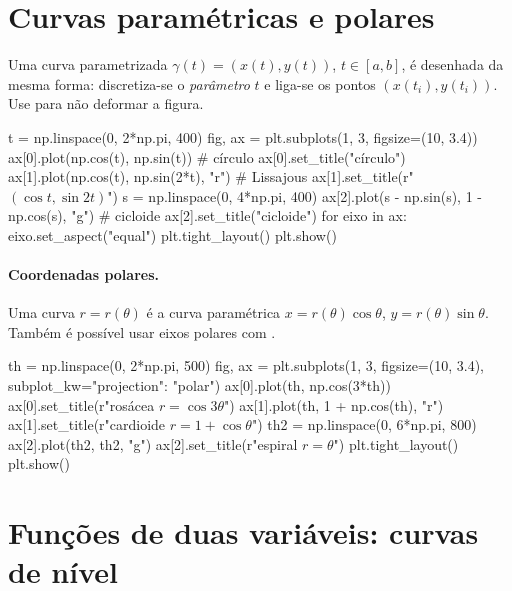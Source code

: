 \section{Curvas paramétricas e polares}

Uma curva parametrizada $\gamma(t)=(x(t),y(t))$, $t\in[a,b]$, é desenhada da mesma forma: discretiza-se o
\emph{parâmetro} $t$ e liga-se os pontos $(x(t_i), y(t_i))$. Use  para não deformar a figura.

\begin{entrada}
t = np.linspace(0, 2*np.pi, 400)
fig, ax = plt.subplots(1, 3, figsize=(10, 3.4))
ax[0].plot(np.cos(t), np.sin(t))                       # círculo
ax[0].set_title("círculo")
ax[1].plot(np.cos(t), np.sin(2*t), "r")                 # Lissajous
ax[1].set_title(r"$(\cos t, \sin 2t)$")
s = np.linspace(0, 4*np.pi, 400)
ax[2].plot(s - np.sin(s), 1 - np.cos(s), "g")          # cicloide
ax[2].set_title("cicloide")
for eixo in ax:
    eixo.set_aspect("equal")
plt.tight_layout()
plt.show()
\end{entrada}

\paragraph{Coordenadas polares.} Uma curva $r=r(\theta)$ é a curva paramétrica
$x=r(\theta)\cos\theta$, $y=r(\theta)\sin\theta$. Também é possível usar eixos polares com
.

\begin{entrada}
th = np.linspace(0, 2*np.pi, 500)
fig, ax = plt.subplots(1, 3, figsize=(10, 3.4), subplot_kw={"projection": "polar"})
ax[0].plot(th, np.cos(3*th))
ax[0].set_title(r"rosácea $r=\cos 3\theta$")
ax[1].plot(th, 1 + np.cos(th), "r")
ax[1].set_title(r"cardioide $r=1+\cos\theta$")
th2 = np.linspace(0, 6*np.pi, 800)
ax[2].plot(th2, th2, "g")
ax[2].set_title(r"espiral $r=\theta$")
plt.tight_layout()
plt.show()
\end{entrada}

\section{Funções de duas variáveis: curvas de nível}

